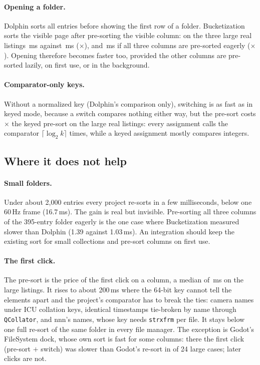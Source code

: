 \documentclass[11pt]{article}
\theoremstyle{definition}
\begin{document}
\paragraph{Opening a folder.} Dolphin sorts all entries before showing the
first row of a folder. Bucketization sorts the visible page after pre-sorting
the visible column: on the three large real listings \,ms
against \,ms ($\times$), and
\,ms if all three columns are pre-sorted eagerly
($\times$). Opening therefore becomes faster too,
provided the other columns are pre-sorted lazily, on first use, or in the
background.

\paragraph{Comparator-only keys.} Without a normalized key (Dolphin's
comparison only), switching is as fast as in keyed mode, because a switch
compares nothing either way, but the pre-sort costs
$\times$ the keyed pre-sort on the large real
listings: every assignment calls the comparator $\lceil\log_2 k\rceil$ times,
while a keyed assignment mostly compares integers.

\subsection{Where it does not help}

\paragraph{Small folders.} Under about 2{,}000 entries every project re-sorts
in a few milliseconds, below one 60\,Hz frame (16.7\,ms). The gain is real but
invisible. Pre-sorting all three columns of the 395-entry folder eagerly is the
one case where Bucketization measured slower than Dolphin (1.39 against
1.03\,ms). An integration should keep the existing sort for small collections
and pre-sort columns on first use.

\paragraph{The first click.} The pre-sort is the price of the first click on a
column, a median of \,ms on the large listings.
It rises to about 200\,ms where the 64-bit key cannot tell the elements apart
and the project's comparator has to break the ties: camera names under ICU
collation keys, identical timestamps tie-broken by name through
\texttt{QCollator}, and nnn's names, whose key needs \texttt{strxfrm} per file.
It stays below one full re-sort of the same folder in every file manager.
The exception is Godot's FileSystem dock, whose own sort is fast for some
columns: there the first click (pre-sort $+$ switch) was slower than Godot's
re-sort in  of 24 large cases; later clicks are not.
\end{document}
